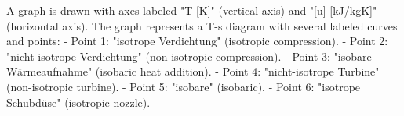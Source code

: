 A graph is drawn with axes labeled "T [K]" (vertical axis) and "[u] [kJ/kgK]" (horizontal axis). The graph represents a T-s diagram with several labeled curves and points:  
- Point 1: "isotrope Verdichtung" (isotropic compression).  
- Point 2: "nicht-isotrope Verdichtung" (non-isotropic compression).  
- Point 3: "isobare Wärmeaufnahme" (isobaric heat addition).  
- Point 4: "nicht-isotrope Turbine" (non-isotropic turbine).  
- Point 5: "isobare" (isobaric).  
- Point 6: "isotrope Schubdüse" (isotropic nozzle).